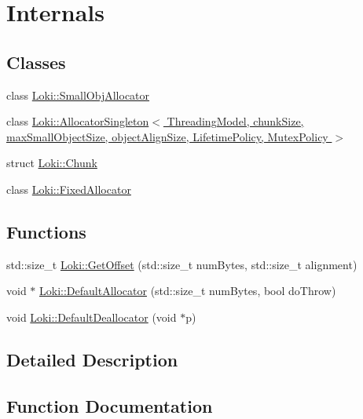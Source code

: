 \hypertarget{group__SmallObjectGroupInternal}{}\section{Internals}
\label{group__SmallObjectGroupInternal}
\subsection*{Classes}
\begin{DoxyCompactItemize}
\item 
class \hyperlink{classLoki_1_1SmallObjAllocator}{Loki\+::\+Small\+Obj\+Allocator}
\item 
class \hyperlink{classLoki_1_1AllocatorSingleton}{Loki\+::\+Allocator\+Singleton$<$ Threading\+Model, chunk\+Size, max\+Small\+Object\+Size, object\+Align\+Size, Lifetime\+Policy, Mutex\+Policy $>$}
\item 
struct \hyperlink{classLoki_1_1Chunk}{Loki\+::\+Chunk}
\item 
class \hyperlink{classLoki_1_1FixedAllocator}{Loki\+::\+Fixed\+Allocator}
\end{DoxyCompactItemize}
\subsection*{Functions}
\begin{DoxyCompactItemize}
\item 
std\+::size\+\_\+t \hyperlink{group__SmallObjectGroupInternal_ga2f0821e243f812a3ae2abfaea51895e8}{Loki\+::\+Get\+Offset} (std\+::size\+\_\+t num\+Bytes, std\+::size\+\_\+t alignment)
\item 
void $\ast$ \hyperlink{group__SmallObjectGroupInternal_ga2444c5bff0a61b6751fb5f57e0c7e8c7}{Loki\+::\+Default\+Allocator} (std\+::size\+\_\+t num\+Bytes, bool do\+Throw)
\item 
void \hyperlink{group__SmallObjectGroupInternal_ga1d24bf776342ace8f2004e3a173f6cb3}{Loki\+::\+Default\+Deallocator} (void $\ast$p)
\end{DoxyCompactItemize}


\subsection{Detailed Description}


\subsection{Function Documentation}
\hypertarget{group__SmallObjectGroupInternal_ga2444c5bff0a61b6751fb5f57e0c7e8c7}{}
